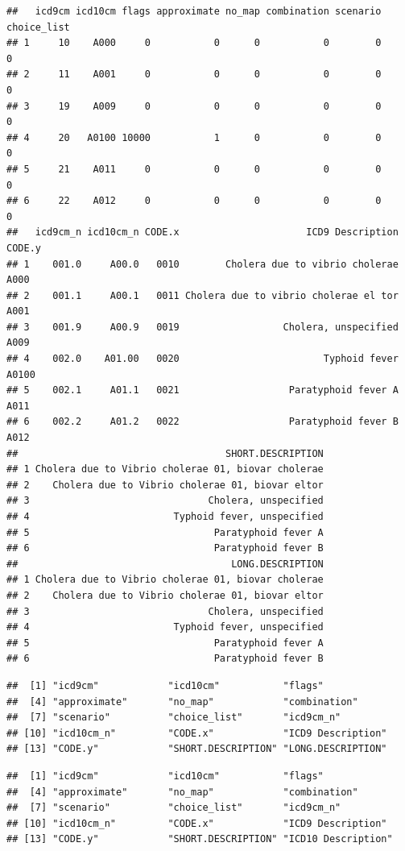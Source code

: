 \documentclass[
]{article}
\begin{document}
\begin{verbatim}
##   icd9cm icd10cm flags approximate no_map combination scenario choice_list
## 1     10    A000     0           0      0           0        0           0
## 2     11    A001     0           0      0           0        0           0
## 3     19    A009     0           0      0           0        0           0
## 4     20   A0100 10000           1      0           0        0           0
## 5     21    A011     0           0      0           0        0           0
## 6     22    A012     0           0      0           0        0           0
##   icd9cm_n icd10cm_n CODE.x                      ICD9 Description CODE.y
## 1    001.0     A00.0   0010        Cholera due to vibrio cholerae   A000
## 2    001.1     A00.1   0011 Cholera due to vibrio cholerae el tor   A001
## 3    001.9     A00.9   0019                  Cholera, unspecified   A009
## 4    002.0    A01.00   0020                         Typhoid fever  A0100
## 5    002.1     A01.1   0021                   Paratyphoid fever A   A011
## 6    002.2     A01.2   0022                   Paratyphoid fever B   A012
##                                    SHORT.DESCRIPTION
## 1 Cholera due to Vibrio cholerae 01, biovar cholerae
## 2    Cholera due to Vibrio cholerae 01, biovar eltor
## 3                               Cholera, unspecified
## 4                         Typhoid fever, unspecified
## 5                                Paratyphoid fever A
## 6                                Paratyphoid fever B
##                                     LONG.DESCRIPTION
## 1 Cholera due to Vibrio cholerae 01, biovar cholerae
## 2    Cholera due to Vibrio cholerae 01, biovar eltor
## 3                               Cholera, unspecified
## 4                         Typhoid fever, unspecified
## 5                                Paratyphoid fever A
## 6                                Paratyphoid fever B
\end{verbatim}

\begin{verbatim}
##  [1] "icd9cm"            "icd10cm"           "flags"            
##  [4] "approximate"       "no_map"            "combination"      
##  [7] "scenario"          "choice_list"       "icd9cm_n"         
## [10] "icd10cm_n"         "CODE.x"            "ICD9 Description" 
## [13] "CODE.y"            "SHORT.DESCRIPTION" "LONG.DESCRIPTION"
\end{verbatim}

\begin{verbatim}
##  [1] "icd9cm"            "icd10cm"           "flags"            
##  [4] "approximate"       "no_map"            "combination"      
##  [7] "scenario"          "choice_list"       "icd9cm_n"         
## [10] "icd10cm_n"         "CODE.x"            "ICD9 Description" 
## [13] "CODE.y"            "SHORT.DESCRIPTION" "ICD10 Description"
\end{verbatim}
\end{document}
